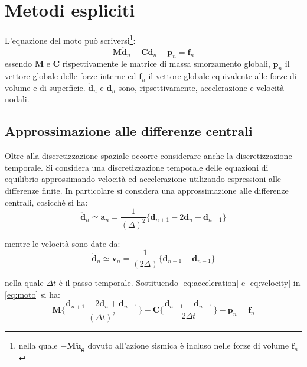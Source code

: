 \section{Metodi espliciti}
L'equazione del moto può scriversi\footnote{nella quale $-\boldsymbol{M \ddot{u}_g}$ 
dovuto all'azione sismica è incluso nelle forze di volume $\boldsymbol{f}_n$}:
\begin{equation}
	\boldsymbol {M\ddot d}_n + \boldsymbol C \boldsymbol{\dot d}_n + \boldsymbol{p}_n = \boldsymbol{f}_n
	\label{eq:moto}
\end{equation}
essendo $\boldsymbol{M}$ e $\boldsymbol{C}$ rispettivamente le matrice di massa smorzamento globali,  
$\boldsymbol{p}_n$ il vettore globale delle forze interne ed $\boldsymbol{f}_n$ il vettore globale 
equivalente alle forze di volume e di superficie. $\boldsymbol{\ddot d}_n$ e $\boldsymbol{\dot d}_n$ 
sono, ripsettivamente, accelerazione e velocità nodali.

\subsection{Approssimazione alle differenze centrali}
Oltre alla discretizzazione spaziale occorre considerare anche la discretizzazione temporale. 
Si considera una discretizzazione temporale delle equazioni di equilibrio approssimando 
velocità ed accelerazione utilizando espressioni alle differenze finite. 
In particolare si considera una approssimazione alle differenze centrali, cosicchè si ha:
\begin{equation}
	\boldsymbol{\ddot{d}}_n \simeq \boldsymbol{a}_n = \frac{1}{(\varDelta)^2} \{\boldsymbol{d}_{n+1} -2 \boldsymbol{d}_n + \boldsymbol{d}_{n-1}\}
	\label{eq:acceleration}
\end{equation}

mentre le velocità sono date da:
\begin{equation}
	\boldsymbol{\dot{d}}_n \simeq \boldsymbol{v}_n = \frac{1}{(2\varDelta)} \{\boldsymbol{d}_{n+1} + \boldsymbol{d}_{n-1}\}
	\label{eq:velocity}
\end{equation}

nella quale $\Delta t$ è il passo temporale. 
Sostituendo \ref{eq:acceleration} e \ref{eq:velocity} in \ref{eq:moto} si ha:
\begin{equation}
	\boldsymbol{M} \{ \frac{\boldsymbol{d}_{n+1} -2 \boldsymbol{d}_n + \boldsymbol{d}_{n-1}} {(\Delta t)^2} \} -
	\boldsymbol{C} \{ \frac{\boldsymbol{d}_{n+1} - \boldsymbol{d}_{n-1}}{2 \varDelta t} \} - \boldsymbol{p}_n = \boldsymbol{f}_n
\end{equation}

